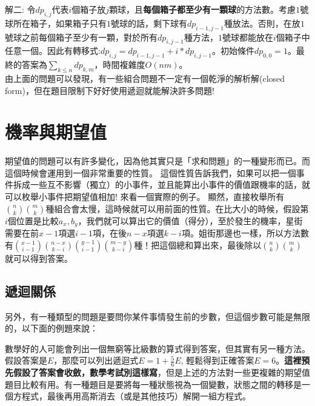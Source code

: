 解二: 令$dp_{i, j}$代表$i$個箱子放$j$顆球，且\textbf{每個箱子都至少有一顆球}的方法數。考慮$1$號球所在箱子，如果箱子只有$1$號球的話，剩下球有$dp_{i-1, j-1}$種放法。否則，在放$1$號球之前每個箱子至少有一顆，對於所有$dp_{i, j-1}$種方法，$1$號球都能放在$i$個箱子中任意一個。因此有轉移式:$dp_{i, j} = dp_{i-1, j-1} + i * dp_{i, j-1}$。初始條件$dp_{0, 0} = 1$。最終的答案為$\sum_{k \leq n} dp_{k, m}$，時間複雜度$O(nm)$。 \\

由上面的問題可以發現，有一些組合問題不一定有一個乾淨的解析解(closed form)，但在題目限制下好好使用遞迴就能解決許多問題!
\newpage
\section{機率與期望值}
期望值的問題可以有許多變化，因為他其實只是「求和問題」的一種變形而已。而這個時候會運用到一個非常重要的性質。
這個性質告訴我們，如果可以把一個事件拆成一些互不影響（獨立）的小事件，並且能算出小事件的價值跟機率的話，就可以枚舉小事件把期望值相加! 來看一個實際的例子。
顯然，直接枚舉所有$\binom{n}{k} \binom{m}{k}$種組合會太慢，這時候就可以用前面的性質。在比大小的時候，假設第$i$個位置是比較$a_x, b_y$，我們就可以算出它的價值（得分），至於發生的機率，星街需要在前$x-1$項選$i-1$項，在後$n-x$項選$k-i$項。姐街那邊也一樣，所以方法數有$\binom{x-1}{i-1} \binom{n-x}{k-i} \binom{y-1}{i-1} \binom{m - y}{k-i}$種！把這個總和算出來，最後除以$\binom{n}{k} \binom{m}{k}$就可以得到答案。
\subsection{遞迴關係}
\par 另外，有一種類型的問題是要問你某件事情發生前的步數，但這個步數可能是無限的，以下面的例題來說：
\par 數學好的人可能會列出一個無窮等比級數的算式得到答案，但其實有另一種方法。假設答案是$E$，那麼可以列出遞迴式$E = 1 + \frac{5}{6}E$, 輕鬆得到正確答案$E = 6$。\textbf{這裡預先假設了答案會收斂，數學考試別這樣寫}，但是上述的方法對一些更複雜的期望值題目比較有用。有一種題目是要將每一種狀態視為一個變數，狀態之間的轉移是一個方程式，最後再用高斯消去（或是其他技巧）解開一組方程式。

